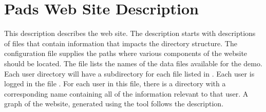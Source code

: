 \documentclass[nocopyrightspace,natbib,onecolumn,9pt]{sigplanconf}
\begin{document}
\section{Pads Web Site Description}
This \forest{} description describes the \pads{} web site. The
description starts with \pads{} descriptions of files that contain
information that impacts the directory structure. The
configuration file supplies the paths where various components of the
website should be located.  The  file lists the names
of the data files available for the demo.  Each user directory will
have a subdirectory for each file listed in . Each
user is logged in the file .  For each user in this
file, there is a directory with a corresponding name containing all of
the information relevant to that user.  A graph
of the \pads{} website, generated using the  tool
follows the description.

\newpage
\end{document}

